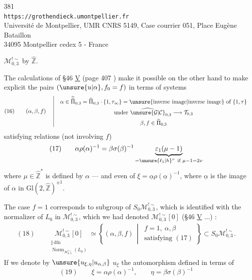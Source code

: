 \begin{center}
381\\
\texttt{https://grothendieck.umontpellier.fr}\\
Université de Montpellier, UMR CNRS 5149, Case courrier 051, Place Eugène Bataillon\\
34095 Montpellier cedex 5 - France
\end{center}

$\mathcal M_{0,3}^{!\sim}$ by $\widehat{\mathbb Z}$.

The calculations of \S 46 \uline{V} (page 407 ) make it possible on the other hand to make explicit the pairs $(\unsure{u|\alpha},f_0=f)$ in terms of systems
\[
(16)\qquad
(\alpha,\beta,f)\quad\left|\quad
\begin{gathered}
\alpha\in\widehat{\widetilde{\Pi}}_{0,3}
 =\widehat{\Pi}_{0,3}\cdot\{1,\tau_\infty\}
 =\text{\unsure{inverse image|inverse image} of }\{1,\tau\}\\
\text{under }\widehat{\unsure{\mathcal G|\mathcal C}}_{0,3}\longrightarrow\mathcal T_{0,3}\\
\beta,f\in\widehat{\Pi}_{0,3}
\end{gathered}\right.
\]
satisfying relations (not involving $f$)
\[
(17)\qquad
\alpha\rho(\alpha)^{-1}
 =\beta\sigma(\beta)^{-1}
 \underbrace{\varepsilon_1(\mu-1)}_{=\unsure{\ell_1|h}^{\nu}\ \text{if }\mu-1=2\nu}
\]
where $\mu\in\widehat{\mathbb Z}^{*}$ is defined   by $\alpha$ --- and even   of $\xi=\underline\alpha\rho(\underline\alpha)^{-1}$, where $\underline\alpha$ is the image of $\alpha$ in $\mathrm{Gl}(2,\widehat{\mathbb Z})^{\pm1}$.

The case $f=1$ corresponds to  subgroup of $S_0\mathcal M_{0,3}^{!\sim}$, which is identified with the normalizer of $L_0$ in $\mathcal M_{0,3}^{!\sim}$, which we had denoted $\mathcal M_{0,3}^{!\sim}[0]$ (\S 46 \uline{V} $\ldots$) :
\[
\begin{gathered}
(18)\qquad
\underset{\substack{\Vert\ \mathrm{dfn}\\
\operatorname{Norm}_{\mathcal M_{0,3}^{!\sim}}(L_0)}}{\mathcal M_{0,3}^{!\sim}[0]}
\simeq
\left\{(\alpha,\beta,f)\,\middle|\,
\begin{array}{l}f=1,\ \alpha,\beta\\\text{satisfying }(17)\end{array}\right\}
\subset S_0\mathcal M_{0,3}^{!\sim} .
\end{gathered}
\]
If we denote by $\unsure{u_{\xi,\eta}|u_{\alpha,\beta}}$    $u_\xi$ the automorphism defined in terms of
\[
(19)\qquad
\xi=\alpha\rho(\alpha)^{-1},\qquad
\eta=\beta\sigma(\beta)^{-1}
\]

